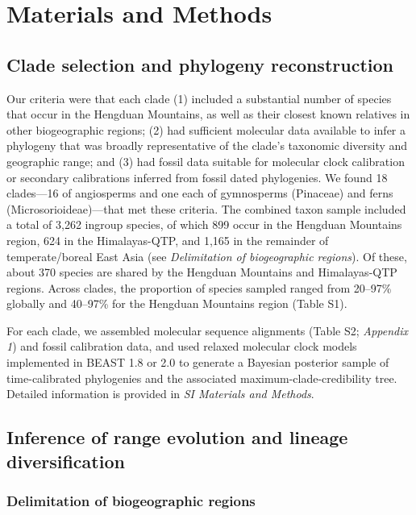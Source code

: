 \section{Materials and Methods}

\subsection{Clade selection and phylogeny reconstruction}

Our criteria were that each clade (1) included a substantial number of species that occur in the Hengduan Mountains, as well as their closest known relatives in other biogeographic regions; (2) had sufficient molecular data available to infer a phylogeny that was broadly representative of the clade's taxonomic diversity and geographic range; and (3) had fossil data suitable for molecular clock calibration or secondary calibrations inferred from fossil dated phylogenies. We found 18 clades---16 of angiosperms and one each of gymnosperms (Pinaceae) and ferns (Microsorioideae)---that met these criteria. The combined taxon sample included a total of 3,262 ingroup species, of which 899 occur in the Hengduan Mountains region, 624 in the Himalayas-QTP, and 1,165 in the remainder of temperate/boreal East Asia (see \textit{Delimitation of biogeographic regions}). Of these, about 370 species are shared by the Hengduan Mountains and Himalayas-QTP regions. Across clades, the proportion of species sampled ranged from 20--97\% globally and 40--97\% for the Hengduan Mountains region (Table S1).

For each clade, we assembled molecular sequence alignments (Table S2; \textit{Appendix 1}) and fossil calibration data, and used relaxed molecular clock models implemented in BEAST 1.8 \citep{Drummond2012} or 2.0 \citep{Bouckaert2014} to generate a Bayesian posterior sample of time-calibrated phylogenies and the associated maximum-clade-credibility tree.  Detailed information is provided in \textit{SI Materials and Methods}.


\subsection{Inference of range evolution and lineage diversification}

\subsubsection{Delimitation of biogeographic regions}

